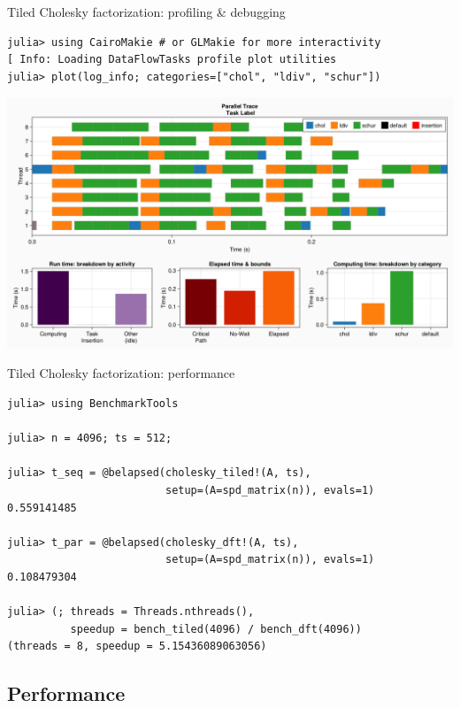\documentclass{beamer}
\begin{document}
\begin{frame}[fragile]{Tiled Cholesky factorization: profiling \& debugging}
\begin{verbatim}
julia> using CairoMakie # or GLMakie for more interactivity
[ Info: Loading DataFlowTasks profile plot utilities
julia> plot(log_info; categories=["chol", "ldiv", "schur"])
\end{verbatim}
\includegraphics[width=\textwidth]{Cholesky_profile.png}
\end{frame}

\begin{frame}[fragile]{Tiled Cholesky factorization: performance}
\begin{verbatim}
julia> using BenchmarkTools

julia> n = 4096; ts = 512;

julia> t_seq = @belapsed(cholesky_tiled!(A, ts),
                         setup=(A=spd_matrix(n)), evals=1)
0.559141485

julia> t_par = @belapsed(cholesky_dft!(A, ts),
                         setup=(A=spd_matrix(n)), evals=1)
0.108479304

julia> (; threads = Threads.nthreads(),
          speedup = bench_tiled(4096) / bench_dft(4096))
(threads = 8, speedup = 5.15436089063056)
\end{verbatim}
\end{frame}

\subsection{Performance}
\end{document}
